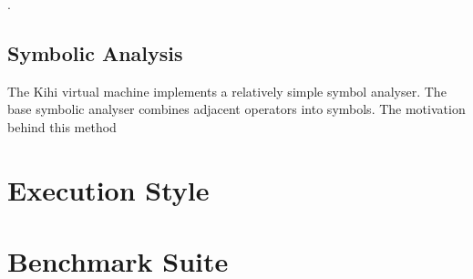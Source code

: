 .



\subsection{Symbolic Analysis}
The Kihi virtual machine implements a relatively simple symbol analyser.
The base symbolic analyser combines adjacent operators into symbols. The
motivation behind this method

\section{Execution Style}


\section{Benchmark Suite}


